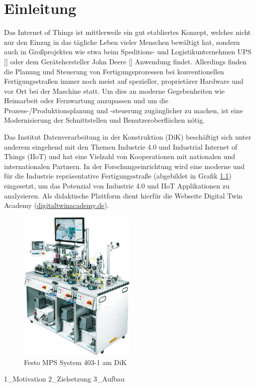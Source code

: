 \chapter{Einleitung}
\label{cha:einleitung}

Das Internet of Things ist mittlerweile ein gut etabliertes Konzept, welches nicht nur den Einzug in das tägliche Leben vieler Menschen bewältigt hat, sondern auch in Großprojekten wie etwa beim Speditions- und Logistikunternehmen UPS [\cite{ups}] oder dem Gerätehersteller John Deere [\cite{johndeere}] Anwendung findet. Allerdings finden die Planung und Steuerung von Fertigungsprozessen bei konventionellen Fertigungsstraßen immer noch meist auf spezieller, proprietärer Hardware und vor Ort bei der Maschine statt. Um dies an moderne Gegebenheiten wie Heimarbeit oder Fernwartung anzupassen und um die Prozess-/Produktionsplanung und -steuerung zugänglicher zu machen, ist eine Modernisierung der Schnittstellen und Benutzeroberflächen nötig.

Das Institut Datenverarbeitung in der Konstruktion (DiK) beschäftigt sich unter anderem eingehend mit den Themen Industrie 4.0 und Industrial Internet of Things (IIoT) und hat eine Vielzahl von Kooperationen mit nationalen und internationalen Partnern. In der Forschungseinrichtung wird eine moderne und für die Industrie repräsentative Fertigungsstraße (abgebildet in Grafik \ref{fig:dikAnlage}) eingesetzt, um das Potenzial von Industrie 4.0 und IIoT Applikationen zu analysieren. Als didaktische Plattform dient hierfür die Webseite Digital Twin Academy (\href{https://digitaltwinacademy.de/}{digitaltwinacademy.de}).
%
\begin{figure}[htbp]
	\centering\includegraphics[width=0.5\textwidth]{images/01/DiK_Anlage.jpg}
    \caption{Festo MPS System 403-1 am DiK}
    \label{fig:dikAnlage}
\end{figure}

{1_Motivation}
{2_Zielsetzung}
{3_Aufbau}
